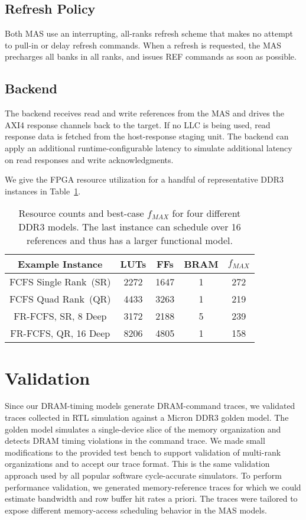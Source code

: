 \subsection{Refresh Policy}
Both MAS use an interrupting, all-ranks refresh scheme that makes no attempt to
pull-in or delay refresh commands.  When a refresh is requested, the MAS
precharges all banks in all ranks, and issues REF commands as soon as possible.

\subsection{Backend}
The backend receives read and write references from the MAS and drives the AXI4
response channels back to the target. If no LLC is being used, read response data is fetched from the host-response staging unit.
The backend can apply an additional runtime-configurable latency to simulate
additional latency on read responses and write acknowledgments.

We give the FPGA resource utilization for a handful of representative DDR3
instances in Table~\ref{tbl:dram-model-resources}.

\begin{table}[htb]
\centering
    \begin{tabular}{c c c c c}
	\hline
        \textbf{Example Instance} & LUTs & FFs & BRAM & $f_{MAX}$ \\
	\hline
        FCFS Single Rank~(SR)    & 2272 & 1647 & 1 & 272 \\
        FCFS Quad Rank~(QR)    & 4433 & 3263 & 1 & 219 \\
        FR-FCFS, SR, 8 Deep & 3172 & 2188 & 5 & 239 \\
        FR-FCFS, QR, 16 Deep & 8206 & 4805 & 1 & 158 \\
	\hline
	\end{tabular}
    \caption{Resource counts and best-case $f_{MAX}$ for four different DDR3
    models. The last instance can schedule over 16 references and thus has a larger functional model.}
\label{tbl:dram-model-resources}
\end{table}

\section{Validation}
Since our DRAM-timing models generate DRAM-command traces, we validated
traces collected in RTL simulation against a Micron DDR3 golden model. The golden
model simulates a single-device slice of the memory organization and detects
DRAM timing violations in the command trace.  We made small modifications to
the provided test bench to support validation of multi-rank organizations and
to accept our trace format. This is the same validation approach used by all
popular software cycle-accurate simulators.
To perform performance validation, we generated memory-reference traces for
which we could estimate bandwidth and row buffer hit rates a priori. The traces
were tailored to expose different memory-access scheduling behavior in the MAS
models.

